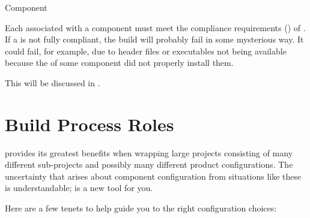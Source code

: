 \begin{description}
\item Component \makefile

  Each \makefile associated with a component must meet the compliance
  requirements () of \lmsbw.  If a
  \makefile is not fully compliant, the build will probably fail in
  some mysterious way.  It could fail, for example, due to header
  files or executables not being available because the \makefile of
  some component did not properly install them.

  This will be discussed in .

\end{description}

\section{Build Process Roles}\label{wrap:build-process-roles}

\lmsbw provides its greatest benefits when wrapping large projects
consisting of many different sub-projects and possibly many different
product configurations.  The uncertainty that arises about component
configuration from situations like these is understandable; \lmsbw is
a new tool for you.

Here are a few tenets to help guide you to the right configuration
choices:

